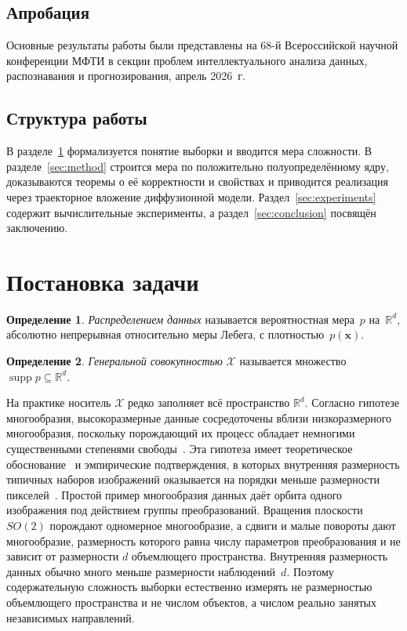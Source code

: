 \documentclass[14pt, a4paper]{extarticle}
\theoremstyle{definition}
\newtheorem{definition}{Определение}[section]
\theoremstyle{plain}
\begin{document}
\subsection{Апробация}

Основные результаты работы были представлены на 68-й
Всероссийской научной конференции МФТИ в секции проблем интеллектуального анализа
данных, распознавания и прогнозирования, апрель 2026~г.

\subsection{Структура работы}

В разделе~\ref{sec:problem} формализуется понятие
выборки и вводится мера сложности. В разделе~\ref{sec:method} строится мера по
положительно полуопределённому ядру, доказываются теоремы о её корректности и
свойствах и приводится реализация через траекторное вложение диффузионной модели.
Раздел~\ref{sec:experiments} содержит вычислительные эксперименты, а
раздел~\ref{sec:conclusion} посвящён заключению.


\section{Постановка задачи}
\label{sec:problem}


\begin{definition}
\label{def:distribution}
\emph{Распределением данных} называется вероятностная мера~$p$ на~$\mathbb{R}^d$,
абсолютно непрерывная относительно меры Лебега, с плотностью~$p(\mathbf{x})$.
\end{definition}

\begin{definition}
\label{def:population}
\emph{Генеральной совокупностью} $\mathcal{X}$ называется множество $\operatorname{supp} p \subseteq \mathbb{R}^d$.
\end{definition}

На практике носитель $\mathcal{X}$ редко заполняет всё
пространство $\mathbb{R}^d$. Согласно гипотезе многообразия, высокоразмерные данные
сосредоточены вблизи низкоразмерного многообразия, поскольку порождающий их
процесс обладает немногими существенными степенями
свободы~\cite{Narayanan2011Sample,Ma2011Manifold}. Эта гипотеза имеет теоретическое
обоснование~\cite{Fefferman2016Testing} и эмпирические подтверждения, в которых
внутренняя размерность типичных наборов изображений оказывается на порядки меньше
размерности пикселей~\cite{Pope2021Intrinsic,Tempczyk2022LIDL}. Простой пример
многообразия данных даёт орбита одного изображения под действием группы
преобразований. Вращения плоскости $SO(2)$ порождают одномерное многообразие, а
сдвиги и малые повороты дают многообразие, размерность которого равна числу
параметров преобразования и не зависит от размерности $d$ объемлющего
пространства. Внутренняя размерность данных обычно много меньше размерности
наблюдений~$d$. Поэтому содержательную сложность выборки естественно измерять не
размерностью объемлющего пространства и не числом объектов, а числом реально
занятых независимых направлений.
\end{document}
